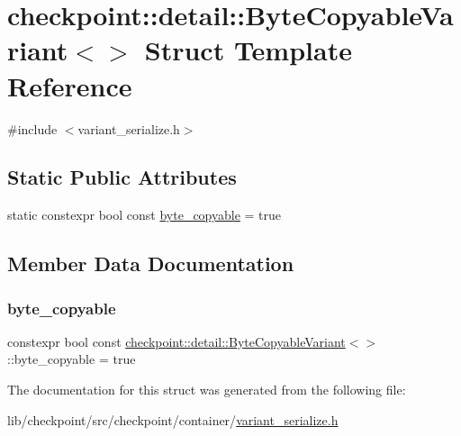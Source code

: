 \hypertarget{structcheckpoint_1_1detail_1_1_byte_copyable_variant_3_4}{}\section{checkpoint\+:\+:detail\+:\+:Byte\+Copyable\+Variant$<$$>$ Struct Template Reference}
\label{structcheckpoint_1_1detail_1_1_byte_copyable_variant_3_4}


{\ttfamily \#include $<$variant\+\_\+serialize.\+h$>$}

\subsection*{Static Public Attributes}
\begin{DoxyCompactItemize}
\item 
static constexpr bool const \hyperlink{structcheckpoint_1_1detail_1_1_byte_copyable_variant_3_4_a3b7e0455491d4910df7e3f0996d1ef20}{byte\+\_\+copyable} = true
\end{DoxyCompactItemize}


\subsection{Member Data Documentation}
\mbox{\label{structcheckpoint_1_1detail_1_1_byte_copyable_variant_3_4_a3b7e0455491d4910df7e3f0996d1ef20}} 
\subsubsection{\texorpdfstring{byte\+\_\+copyable}{byte\_copyable}}
{\footnotesize\ttfamily constexpr bool const \hyperlink{structcheckpoint_1_1detail_1_1_byte_copyable_variant}{checkpoint\+::detail\+::\+Byte\+Copyable\+Variant}$<$$>$\+::byte\+\_\+copyable = true\hspace{0.3cm}{\ttfamily [static]}}



The documentation for this struct was generated from the following file\+:\begin{DoxyCompactItemize}
\item 
lib/checkpoint/src/checkpoint/container/\hyperlink{variant__serialize_8h}{variant\+\_\+serialize.\+h}\end{DoxyCompactItemize}
